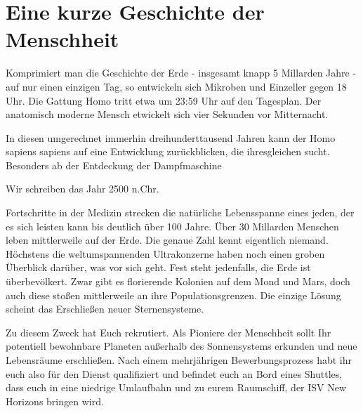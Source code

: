 \chapter[Prolog]{Eine kurze Geschichte der Menschheit}

\begin{say}
Komprimiert man die Geschichte der Erde - insgesamt knapp 5 Millarden Jahre - auf nur einen einzigen Tag, so entwickeln sich Mikroben und Einzeller gegen
18 Uhr. Die Gattung Homo tritt etwa um 23:59 Uhr auf den Tagesplan. Der anatomisch moderne Mensch etwickelt sich vier Sekunden vor Mitternacht.

In diesen umgerechnet immerhin dreihunderttausend Jahren kann der Homo sapiens sapiens auf eine Entwicklung zurückblicken, die ihresgleichen sucht.
Besonders ab der Entdeckung der Dampfmaschine 

Wir schreiben das Jahr 2500 n.Chr.

Fortschritte in der Medizin strecken die natürliche Lebensspanne eines jeden, der es sich leisten kann bis deutlich über 100 Jahre. Über 30 Millarden
Menschen leben mittlerweile auf der Erde. Die genaue Zahl kennt eigentlich niemand. Höchstens die weltumspannenden Ultrakonzerne haben noch einen groben
Überblick darüber, was vor sich geht. Fest steht jedenfalls, die Erde ist überbevölkert. Zwar gibt es florierende Kolonien auf dem Mond und Mars, doch auch
diese stoßen mittlerweile an ihre Populationsgrenzen. Die einzige Lösung scheint das Erschließen neuer Sternensysteme.

Zu diesem Zweck hat  Euch rekrutiert. Als Pioniere der Menschheit sollt Ihr potentiell bewohnbare Planeten außerhalb des Sonnensystems
erkunden und neue Lebensräume erschließen. Nach einem mehrjährigen Bewerbungsprozess habt ihr euch also für den Dienst qualifiziert und befindet euch an
Bord eines Shuttles, dass euch in eine niedrige Umlaufbahn und zu eurem Raumschiff, der ISV New Horizons bringen wird.
\end{say}
